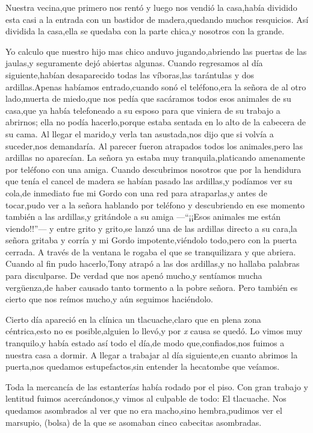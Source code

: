 \documentclass[letterpaper,12pt]{book}
\begin{document}
Nuestra vecina,que primero nos rentó y luego nos vendió la casa,había dividido esta casi a la entrada con un bastidor de madera,quedando muchos resquicios. Así dividida la  casa,ella se quedaba con la parte chica,y nosotros con la grande.

Yo calculo que nuestro hijo mas chico anduvo jugando,abriendo las puertas de las jaulas,y seguramente dejó abiertas algunas. Cuando regresamos al día siguiente,habían desaparecido todas las víboras,las tarántulas y dos ardillas.Apenas habíamos entrado,cuando sonó el teléfono,era la señora de al otro lado,muerta de miedo,que nos pedía que sacáramos todos esos animales de su casa,que ya había telefoneado a su esposo para que viniera de su trabajo a abrirnos; ella no podía hacerlo,porque estaba sentada en lo alto de la cabecera de su cama. Al llegar el marido,y verla tan asustada,nos dijo que si volvía a suceder,nos demandaría. Al parecer fueron atrapados todos los animales,pero las ardillas no aparecían. La señora ya estaba muy tranquila,platicando amenamente  por teléfono con una amiga. Cuando descubrimos nosotros que por la hendidura que tenía el cancel de madera se habían pasado las ardillas,y podíamos ver su cola,de inmediato fue mi Gordo con una red para atraparlas,y antes de tocar,pudo ver a la señora hablando por teléfono y descubriendo en ese momento también a las ardillas,y gritándole a su amiga ---``¡¡Esos animales me están viendo!!''--- y entre grito y grito,se lanzó una de las ardillas directo a su cara,la señora gritaba y corría y mi Gordo impotente,viéndolo todo,pero con la puerta cerrada. A través de la ventana le rogaba el que se tranquilizara y que abriera. Cuando al fin pudo hacerlo,Tony atrapó a las dos ardillas,y no hallaba palabras para disculparse. De verdad que nos apenó mucho,y sentíamos mucha vergüenza,de haber causado tanto tormento a la pobre señora. Pero también  es cierto que nos reímos mucho,y aún seguimos haciéndolo.

Cierto día apareció en la clínica un tlacuache,claro que en plena zona céntrica,esto no es posible,alguien lo llevó,y por \textit{x } causa se quedó. Lo vimos muy tranquilo,y había estado así todo el día,de modo que,confiados,nos fuimos a nuestra casa a dormir. A llegar a trabajar al día siguiente,en cuanto abrimos la puerta,nos quedamos estupefactos,sin entender la hecatombe que veíamos.

Toda la mercancía de las estanterías había rodado por el piso. Con gran trabajo y lentitud fuimos acercándonos,y vimos al culpable de todo: El tlacuache. Nos quedamos asombrados al ver que no era macho,sino hembra,pudimos ver el marsupio, (bolsa) de la que se asomaban cinco cabecitas asombradas.
\end{document}
